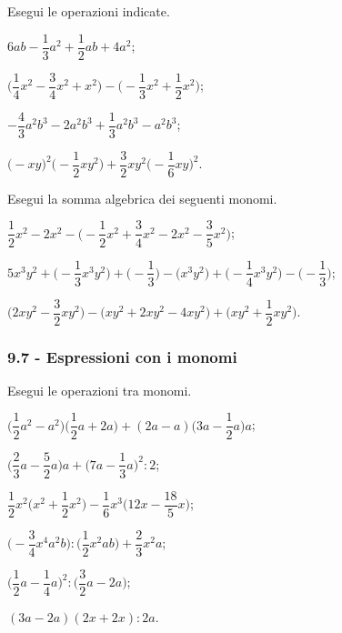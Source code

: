 \begin{esercizio}
 \label{ese:9.31}
Esegui le operazioni indicate.
\begin{multicols}{2}
\begin{enumeratea}
\spazielenx
 \item $6ab-\dfrac{1}{3}a^{2}+\dfrac{1}{2}ab+4a^{2}$;
 \item $\bigg(\dfrac{1}{4}x^{2}-\dfrac{3}{4}x^{2}+x^{2}\bigg)-\bigg(-{\dfrac{1}{3}}x^{2}+\dfrac{1}{2}x^{2}\bigg)$;
 \item $-{\dfrac{4}{3}}a^{2}b^{3}-2a^{2}b^{3}+\dfrac{1}{3}a^{2}b^{3}-a^{2}b^{3}$;
 \item $\big(-xy\big)^{2}\bigg(-{\dfrac{1}{2}}xy^{2}\bigg)+\dfrac{3}{2}xy^{2}\bigg(-{\dfrac{1}{6}}xy\bigg)^{2}$.
\end{enumeratea}
\end{multicols}
\end{esercizio}

\begin{esercizio}
 \label{ese:9.32}
Esegui la somma algebrica dei seguenti monomi.

\begin{enumeratea}
\spazielenx
 \item $\dfrac{1}{2}x^{2}-2x^{2}-\bigg(-{\dfrac{1}{2}}x^{2}+\dfrac{3}{4}x^{2}-2x^{2}-\dfrac{3}{5}x^{2}\bigg)$;
 \item $5x^{3}y^{2}+\bigg(-{\dfrac{1}{3}}x^{3}y^{2}\bigg)+\bigg(-{\dfrac{1}{3}}\bigg)-\big(x^{3}y^{2}\big)+\bigg(-{\dfrac{1}{4}}x^{3}y^{2}\bigg)-\bigg(-{\dfrac{1}{3}}\bigg)$;
 \item $\bigg(2xy^{2}-\dfrac{3}{2}xy^{2}\bigg)-\big(xy^{2}+2xy^{2}-4xy^{2}\big)+\bigg(xy^{2}+\dfrac{1}{2}xy^{2}\bigg)$.
\end{enumeratea}
\end{esercizio}

\subsubsection*{9.7 - Espressioni con i monomi}
\begin{esercizio}[\Ast]
 \label{ese:9.33}
Esegui le operazioni tra monomi.

\begin{enumeratea}
 \item $\bigg(\dfrac{1}{2}a^{2}-a^{2}\bigg)\bigg(\dfrac{1}{2}a+2a\bigg)+(2a-a)\bigg(3a-\dfrac{1}{2}a\bigg)a$;
 \item $\bigg(\dfrac{2}{3}a-\dfrac{5}{2}a\bigg)a+\bigg(7a-\dfrac{1}{3}a\bigg)^{2}:2$;
 \item $\dfrac{1}{2}x^{2}\bigg(x^{2}+\dfrac{1}{2}x^{2}\bigg)-\dfrac{1}{6}x^{3}\bigg(12x-\dfrac{18}{5}x\bigg)$;
 \item $\bigg(-{\dfrac{3}{4}}x^{4}a^{2}b\bigg):\bigg(\dfrac{1}{2}x^{2}ab\bigg)+\dfrac{2}{3}x^{2}a$;
 \item $\bigg(\dfrac{1}{2}a-\dfrac{1}{4}a\bigg)^{2}:\bigg(\dfrac{3}{2}a-2a\bigg)$;
 \item $(3a-2a)(2x+2x):2a$.
\end{enumeratea}
\end{esercizio}

